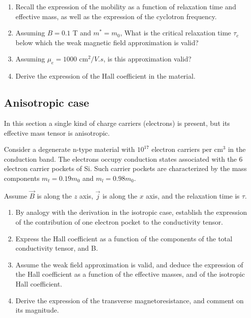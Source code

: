 \begin{enumerate}[label=(\roman*)]
\item Recall the expression of the mobility as a function of
  relaxation time and effective mass, as well as the expression of the
  cyclotron frequency.
\item Assuming $B=0.1$ T and $m^* = m_0$, What is the critical relaxation
  time $\tau_c$ below which the weak magnetic field approximation is valid?
\item Assuming $\mu_e = 1000 \text{ cm}^2/V.s$, is this approximation valid?
\item Derive the expression of the Hall coefficient in the material.
\end{enumerate}

\subsection*{Anisotropic case}

In this section a single kind of charge carriers (electrons) is
present, but its effective mass tensor is
anisotropic.

Consider a degenerate
n-type material with $10^{17}$ electron carriers per cm$^3$ in the
conduction band. The electrons occupy conduction states associated
with the 6 electron carrier pockets of
Si. Such carrier pockets are characterized by the mass components
$m_t = 0.19 m_0$ and $m_l = 0.98 m_0$.

Assume $\vec{B}$ is along the $z$ axis, $\vec{j}$ is along the $x$
axis, and the relaxation time is $\tau$.

\begin{enumerate}[label=(\roman*)]
\item By analogy with the derivation in the isotropic case, establish the
  expression of the contribution of one electron pocket to the
  conductivity tensor.
\item Express the Hall coefficient as a function of the components of
  the total conductivity tensor, and B.
\item Assume the weak field approximation is valid, and deduce the
  expression of the Hall coefficient as a function of the effective
  masses, and of the isotropic Hall coefficient.
\item Derive the expression of the transverse magnetoresistance, and
  comment on its magnitude.
\end{enumerate}


